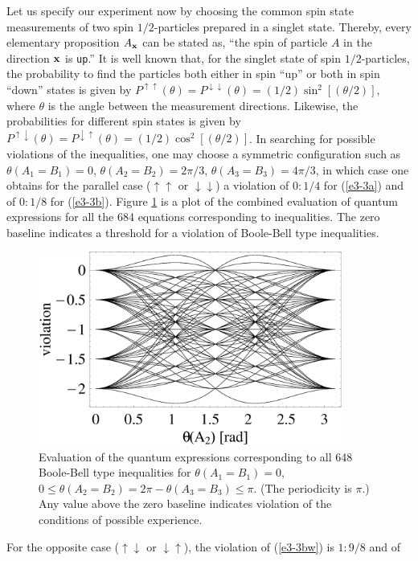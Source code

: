 Let us specify our experiment now by choosing
the common spin state measurements of two spin $1/2$-particles prepared in a singlet state.
Thereby, every elementary proposition $A_{\bf x}$ can be stated as,
``the spin of  particle $A$ in the direction $\bf x$ is {\tt up}.''
It is well known that, for the singlet state of spin $1/2$-particles, the probability
to find the particles  both either in spin ``up'' or both in spin ``down'' states
is given by
$
P^{\uparrow \uparrow} (\theta)=
P^{\downarrow \downarrow} (\theta)=
(1/2)\sin^2[(\theta /2)]
$, where $\theta$ is the angle between the measurement directions.
Likewise, the probabilities for different spin states is given by
$
P^{\uparrow \downarrow} (\theta)=
P^{\downarrow \uparrow} (\theta)=
(1/2)\cos^2[(\theta /2)]
$.
In searching for possible violations of the inequalities,
one may choose a symmetric configuration such as
$\theta(A_1 = B_1) = 0$,
$\theta(A_2 = B_2) = 2\pi / 3 $,
$\theta(A_3 = B_3) = 4\pi / 3 $,
in which case one obtains for the parallel case ($\uparrow \uparrow$ or $\downarrow \downarrow$) a violation
of
$0:1/4$ for (\ref{e3-3a}) and of
$0:1/8$ for (\ref{e3-3b}).
Figure \ref{2000-poly-f1} is a plot of the combined evaluation of quantum expressions
for all the 684 equations corresponding to inequalities.
The zero baseline indicates a threshold for a
violation of Boole-Bell type inequalities.
\begin{figure}
 \includegraphics[width=10cm]{2000-poly-f2.eps}
 \caption{Evaluation of the quantum expressions corresponding to all 648
Boole-Bell type inequalities for
$\theta(A_1 = B_1) = 0$,
$0\le \theta(A_2 = B_2) =2\pi -\theta(A_3 = B_3) \le  \pi$. (The periodicity is $\pi$.)
Any value above the zero baseline indicates violation of the conditions
of possible experience.}
\label{2000-poly-f1}
\end{figure}
For the opposite case ($\uparrow \downarrow$ or $\downarrow \uparrow$), the violation of
(\ref{e3-3bw}) is $1:9/8$ and of
